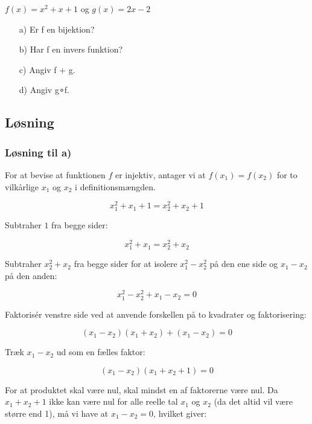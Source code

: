 \documentclass[12pt]{article}
\begin{document}
\vspace{0.25in}
 
\begin{math}f(x) = x^2 + x + 1 \end{math} og
\begin{math}g(x) = 2x - 2 \end{math}

\begin{enumerate}[label=\alph*)] %
\item[a)] Er f en bijektion?
\item[b)] Har f en invers funktion? 
\item[c)] Angiv f + g. 
\item[d)] Angiv g∘f.
\end{enumerate}



\subsection{Løsning}
\subsubsection{Løsning til a)}

For at bevise at funktionen \( f \) er injektiv, antager vi at \( f(x_1) = f(x_2) \) for to vilkårlige \( x_1 \) og \( x_2 \) i definitionsmængden.

\[ x_1^2 + x_1 + 1 = x_2^2 + x_2 + 1 \]

Subtraher \( 1 \) fra begge sider:

\[ x_1^2 + x_1 = x_2^2 + x_2 \]

Subtraher \( x_2^2 + x_2 \) fra begge sider for at isolere \( x_1^2 - x_2^2 \) på den ene side og \( x_1 - x_2 \) på den anden:

\[ x_1^2 - x_2^2 + x_1 - x_2 = 0 \]

Faktorisér venstre side ved at anvende forskellen på to kvadrater og faktorisering:

\[ (x_1 - x_2)(x_1 + x_2) + (x_1 - x_2) = 0 \]

Træk \( x_1 - x_2 \) ud som en fælles faktor:

\[ (x_1 - x_2)(x_1 + x_2 + 1) = 0 \]

For at produktet skal være nul, skal mindst en af faktorerne være nul. Da \( x_1 + x_2 + 1 \) ikke kan være nul for alle reelle tal \( x_1 \) og \( x_2 \) (da det altid vil være større end 1), må vi have at \( x_1 - x_2 = 0 \), hvilket giver:
\end{document}
